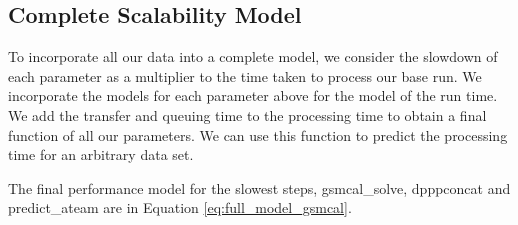 \subsection{Complete Scalability Model}
To incorporate all our data into a complete model, we consider the slowdown of each parameter as a multiplier to the time taken to process our base run. We incorporate the models for each parameter above for the model of the run time. We add the transfer and queuing time to the processing time to obtain a final function of all our parameters. We can use this function to predict the processing time for an arbitrary data set. 

The final performance model for the slowest steps, {\selectfont gsmcal\_solve}, {\selectfont dpppconcat}  and {\selectfont predict\_ateam} are in Equation \ref{eq:full_model_gsmcal}. 

